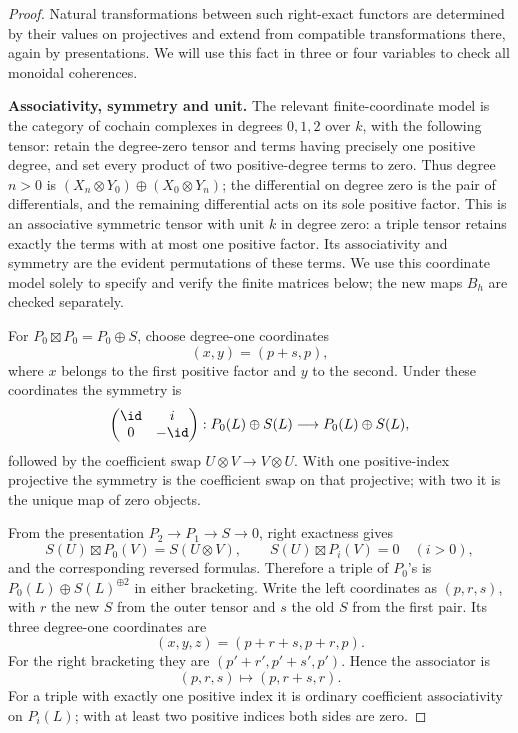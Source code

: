 \begin{proof}
Natural transformations between such right-exact functors are determined by their values on projectives and extend from compatible transformations there, again by presentations. We will use this fact in three or four variables to check all monoidal coherences.

\textbf{Associativity, symmetry and unit.}
The relevant finite-coordinate model is the category of cochain complexes in degrees $0,1,2$ over $k$, with the following tensor: retain the degree-zero tensor and terms having precisely one positive degree, and set every product of two positive-degree terms to zero. Thus degree $n>0$ is $(X_n\otimes Y_0)\oplus(X_0\otimes Y_n)$; the differential on degree zero is the pair of differentials, and the remaining differential acts on its sole positive factor. This is an associative symmetric tensor with unit $k$ in degree zero: a triple tensor retains exactly the terms with at most one positive factor. Its associativity and symmetry are the evident permutations of these terms. We use this coordinate model solely to specify and verify the finite matrices below; the new maps $B_h$ are checked separately.

For $P_0\boxtimes P_0=P_0\oplus S$, choose degree-one coordinates
\[
(x,y)=(p+s,p),
\]
where $x$ belongs to the first positive factor and $y$ to the second. Under these coordinates the symmetry is
\[
\begin{pmatrix}\id&i\\0&-\id\end{pmatrix}:
P_0(L)\oplus S(L)\longrightarrow P_0(L)\oplus S(L),
\]
followed by the coefficient swap $U\otimes V\to V\otimes U$. With one positive-index projective the symmetry is the coefficient swap on that projective; with two it is the unique map of zero objects.

From the presentation $P_2\to P_1\to S\to0$, right exactness gives
\[
S(U)\boxtimes P_0(V)=S(U\otimes V),\qquad
S(U)\boxtimes P_i(V)=0\quad(i>0),
\]
and the corresponding reversed formulas. Therefore a triple of $P_0$'s is $P_0(L)\oplus S(L)^{\oplus2}$ in either bracketing. Write the left coordinates as $(p,r,s)$, with $r$ the new $S$ from the outer tensor and $s$ the old $S$ from the first pair. Its three degree-one coordinates are
\[
(x,y,z)=(p+r+s,p+r,p).
\]
For the right bracketing they are $(p'+r',p'+s',p')$. Hence the associator is
\[
(p,r,s)\longmapsto(p,r+s,r).
\]
For a triple with exactly one positive index it is ordinary coefficient associativity on $P_i(L)$; with at least two positive indices both sides are zero.


\end{proof}
